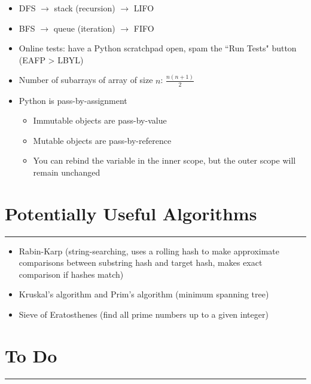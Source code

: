 \documentclass[12pt]{article}
\begin{document}
\begin{itemize}
  \item DFS $\rightarrow$ stack (recursion) $\rightarrow$ LIFO
  \item BFS $\rightarrow$ queue (iteration) $\rightarrow$ FIFO
  \item Online tests: have a Python scratchpad open, spam the ``Run Tests" button (EAFP > LBYL)
  \item Number of subarrays of array of size $n$: $\frac{n(n+1)}{2}$
  \item Python is pass-by-assignment
  \begin{itemize}
    \item Immutable objects are pass-by-value
    \item Mutable objects are pass-by-reference
    \item You can rebind the variable in the inner scope, but the outer scope will remain unchanged
  \end{itemize}
\end{itemize}

\section*{Potentially Useful Algorithms}
\hrule\vspace{5ex}

\begin{itemize}
  \item Rabin-Karp (string-searching, uses a rolling hash to make approximate comparisons between substring hash and target hash, makes exact comparison if hashes match)
  \item Kruskal's algorithm and Prim's algorithm (minimum spanning tree)
  \item Sieve of Eratosthenes (find all prime numbers up to a given integer)
\end{itemize}

\section*{To Do}
\hrule\vspace{5ex}
\end{document}
